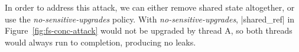 In order to address this attack, we can either remove shared state
altogether, or use the \emph{no-sensitive-upgrades} policy. With
\emph{no-sensitive-upgrades}, |shared_ref| in
Figure~\ref{fig:fs-conc-attack} would not be upgraded by thread A, so
both threads would always run to completion, producing no leaks.


